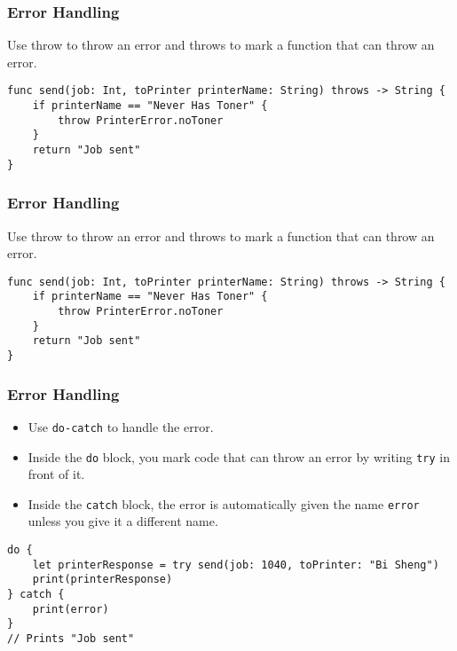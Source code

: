 \begin{frame}[fragile] \frametitle{Error Handling}


Use throw to throw an error and throws to mark a function that can throw an error. 

\begin{lstlisting}
func send(job: Int, toPrinter printerName: String) throws -> String {
    if printerName == "Never Has Toner" {
        throw PrinterError.noToner
    }
    return "Job sent"
}
\end{lstlisting}


\end{frame}

\begin{frame}[fragile] \frametitle{Error Handling}

Use throw to throw an error and throws to mark a function that can throw an error. 

\begin{lstlisting}
func send(job: Int, toPrinter printerName: String) throws -> String {
    if printerName == "Never Has Toner" {
        throw PrinterError.noToner
    }
    return "Job sent"
}
\end{lstlisting}


\end{frame}


\begin{frame}[fragile] \frametitle{Error Handling}

\begin{itemize}
\item Use \lstinline|do-catch| to handle the error.
\item Inside the \lstinline|do| block, you mark code that can throw an error by writing \lstinline|try| in front of it.
\item Inside the \lstinline|catch| block, the error is automatically given the name \lstinline|error| unless you give it a different name. 
\end{itemize}

\begin{lstlisting}
do {
    let printerResponse = try send(job: 1040, toPrinter: "Bi Sheng")
    print(printerResponse)
} catch {
    print(error)
}
// Prints "Job sent"
\end{lstlisting}


\end{frame}

